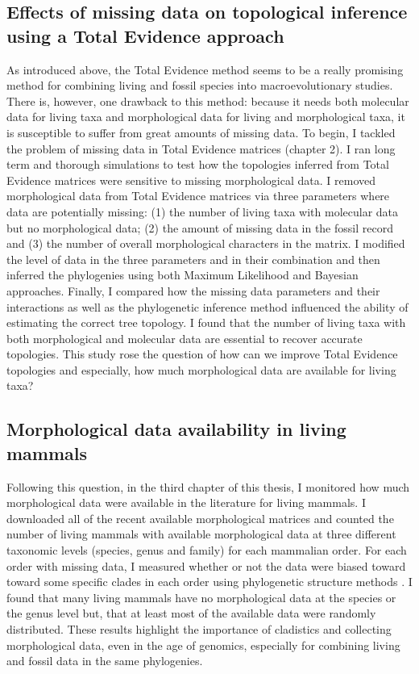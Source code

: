 \subsection{Effects of missing data on topological inference using a Total Evidence approach}
As introduced above, the Total Evidence method seems to be a really promising method for combining living and fossil species into macroevolutionary studies.
There is, however, one drawback to this method: because it needs both molecular data for living taxa and morphological data for living and morphological taxa, it is susceptible to suffer from great amounts of missing data.
To begin, I tackled the problem of missing data in Total Evidence matrices (chapter 2).
I ran long term and thorough simulations to test how the topologies inferred from Total Evidence matrices were sensitive to missing morphological data.
I removed morphological data from Total Evidence matrices via three parameters where data are potentially missing: (1) the number of living taxa with molecular data but no morphological data; (2) the amount of missing data in the fossil record and (3) the number of overall morphological characters in the matrix.
I modified the level of data in the three parameters and in their combination and then inferred the phylogenies using both Maximum Likelihood and Bayesian approaches.
Finally, I compared how the missing data parameters and their interactions as well as the phylogenetic inference method influenced the ability of estimating the correct tree topology.
I found that the number of living taxa with both morphological and molecular data are essential to recover accurate topologies.
This study rose the question of how can we improve Total Evidence topologies and especially, how much morphological data are available for living taxa?

\subsection{Morphological data availability in living mammals}
Following this question, in the third chapter of this thesis, I monitored how much morphological data were available in the literature for living mammals.
I downloaded all of the recent available morphological matrices and counted the number of living mammals with available morphological data at three different taxonomic levels (species, genus and family) for each mammalian order.
For each order with missing data, I measured whether or not the data were biased toward toward some specific clades in each order using phylogenetic structure methods \citep{webb2002phylogenies}.
I found that many living mammals have no morphological data at the species or the genus level but, that at least most of the available data were randomly distributed.
These results highlight the importance of cladistics and collecting morphological data, even in the age of genomics, especially for combining living and fossil data in the same phylogenies.

